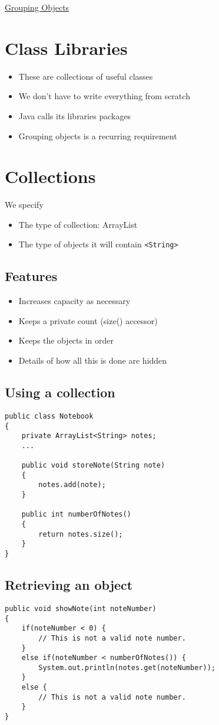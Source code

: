 \documentclass{article}[18pt]
\begin{document}
\begin{center}
\underline{\huge Grouping Objects}
\end{center}
\section{Class Libraries}
\begin{itemize}
	\item These are collections of useful classes
	\item We don't have to write everything from scratch
	\item Java calls its libraries packages
	\item Grouping objects is a recurring requirement
\end{itemize}
\section{Collections}
We specify
\begin{itemize}
	\item The type of collection: ArrayList
	\item The type of objects it will contain \texttt{<String>}
\end{itemize}
\subsection{Features}
\begin{itemize}
	\item Increases capacity as necessary
	\item Keeps a private count (size() accessor)
	\item Keeps the objects in order
	\item Details of how all this is done are hidden
\end{itemize}
\subsection{Using a collection}
\begin{verbatim}
public class Notebook
{
	private ArrayList<String> notes;
	...
	
	public void storeNote(String note)
	{
		notes.add(note);
	}
	
	public int numberOfNotes()
	{
		return notes.size();
	}
}
\end{verbatim}
\subsection{Retrieving an object}
\begin{verbatim}
public void showNote(int noteNumber)
{
	if(noteNumber < 0) {
		// This is not a valid note number.
	}
	else if(noteNumber < numberOfNotes()) {
		System.out.println(notes.get(noteNumber));
	}
	else {
		// This is not a valid note number.
	}
}
\end{verbatim}
\end{document}
